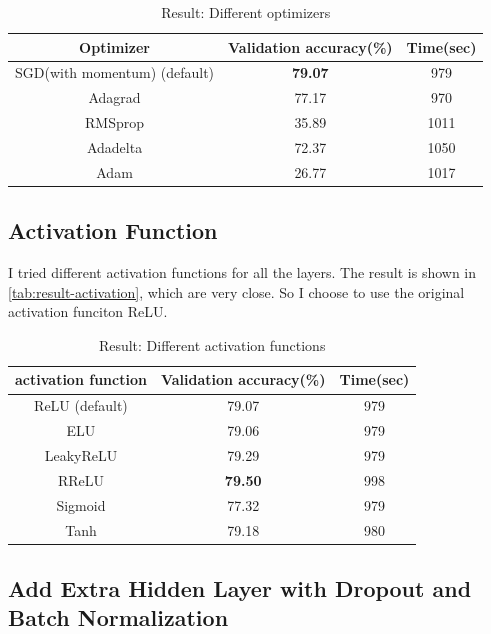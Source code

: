 \documentclass[10pt]{article}
\begin{document}
\begin{table}[htb]
\centering
\caption{Result: Different optimizers}
\begin{tabular}{c|c|c}
\hline
\textbf{Optimizer}   & \textbf{Validation accuracy(\%)}   & \textbf{Time(sec)}   \\ \hline
SGD(with momentum) (default)     & \textbf{79.07}   & 979      \\
Adagrad   &  77.17     & 970   \\
RMSprop      & 35.89    & 1011        \\
Adadelta     & 72.37    & 1050       \\
Adam        & 26.77  & 1017     \\
\hline
\end{tabular}
\label{tab:result-optim}
\end{table}

\subsection{Activation Function}

I tried different activation functions for all the layers. The result is shown in \autoref{tab:result-activation}, which are very close. So I choose to use the original activation funciton ReLU.

\begin{table}[htb]
\centering
\caption{Result: Different activation functions}
\begin{tabular}{c|c|c}
\hline
\textbf{activation function}   & \textbf{Validation accuracy(\%)}   & \textbf{Time(sec)}   \\ \hline
ReLU (default)     & 79.07   & 979      \\
ELU   &  79.06    & 979   \\
LeakyReLU     &   79.29  &  979       \\
RReLU    &  \textbf{79.50}   &   998     \\
Sigmoid        &  77.32 &  979    \\
Tanh       &  79.18 &   980   \\
\hline
\end{tabular}
\label{tab:result-activation}
\end{table}

\subsection{Add Extra Hidden Layer with Dropout and Batch Normalization}
\end{document}
